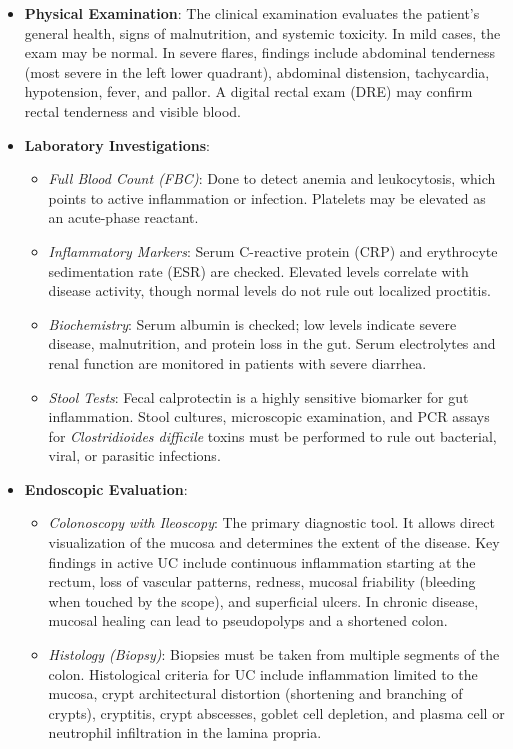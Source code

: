 \begin{itemize}
  \item \textbf{Physical Examination}: The clinical examination evaluates the patient's general health, signs of malnutrition, and systemic toxicity. In mild cases, the exam may be normal. In severe flares, findings include abdominal tenderness (most severe in the left lower quadrant), abdominal distension, tachycardia, hypotension, fever, and pallor. A digital rectal exam (DRE) may confirm rectal tenderness and visible blood.
  \item \textbf{Laboratory Investigations}:
  \begin{itemize}
    \item \textit{Full Blood Count (FBC)}: Done to detect anemia and leukocytosis, which points to active inflammation or infection. Platelets may be elevated as an acute-phase reactant.
    \item \textit{Inflammatory Markers}: Serum C-reactive protein (CRP) and erythrocyte sedimentation rate (ESR) are checked. Elevated levels correlate with disease activity, though normal levels do not rule out localized proctitis.
    \item \textit{Biochemistry}: Serum albumin is checked; low levels indicate severe disease, malnutrition, and protein loss in the gut. Serum electrolytes and renal function are monitored in patients with severe diarrhea.
    \item \textit{Stool Tests}: Fecal calprotectin is a highly sensitive biomarker for gut inflammation. Stool cultures, microscopic examination, and PCR assays for \textit{Clostridioides difficile} toxins must be performed to rule out bacterial, viral, or parasitic infections.
  \end{itemize}
  \item \textbf{Endoscopic Evaluation}:
  \begin{itemize}
    \item \textit{Colonoscopy with Ileoscopy}: The primary diagnostic tool. It allows direct visualization of the mucosa and determines the extent of the disease. Key findings in active UC include continuous inflammation starting at the rectum, loss of vascular patterns, redness, mucosal friability (bleeding when touched by the scope), and superficial ulcers. In chronic disease, mucosal healing can lead to pseudopolyps and a shortened colon.
    \item \textit{Histology (Biopsy)}: Biopsies must be taken from multiple segments of the colon. Histological criteria for UC include inflammation limited to the mucosa, crypt architectural distortion (shortening and branching of crypts), cryptitis, crypt abscesses, goblet cell depletion, and plasma cell or neutrophil infiltration in the lamina propria.

\end{itemize}
\end{itemize}
